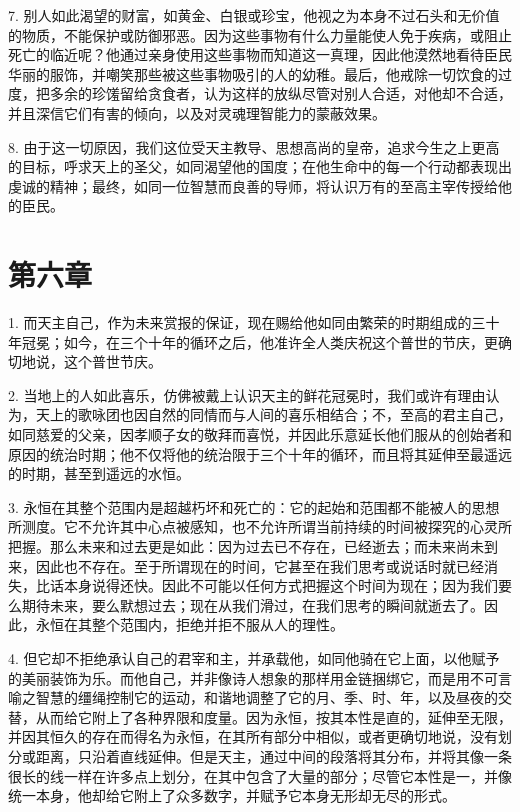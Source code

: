 7. 别人如此渴望的财富，如黄金、白银或珍宝，他视之为本身不过石头和无价值的物质，不能保护或防御邪恶。因为这些事物有什么力量能使人免于疾病，或阻止死亡的临近呢？他通过亲身使用这些事物而知道这一真理，因此他漠然地看待臣民华丽的服饰，并嘲笑那些被这些事物吸引的人的幼稚。最后，他戒除一切饮食的过度，把多余的珍馐留给贪食者，认为这样的放纵尽管对别人合适，对他却不合适，并且深信它们有害的倾向，以及对灵魂理智能力的蒙蔽效果。\par

8. 由于这一切原因，我们这位受天主教导、思想高尚的皇帝，追求今生之上更高的目标，呼求天上的圣父，如同渴望他的国度；在他生命中的每一个行动都表现出虔诚的精神；最终，如同一位智慧而良善的导师，将认识万有的至高主宰传授给他的臣民。\par


\section{第六章}

1. 而天主自己，作为未来赏报的保证，现在赐给他如同由繁荣的时期组成的三十年冠冕；如今，在三个十年的循环之后，他准许全人类庆祝这个普世的节庆，更确切地说，这个普世节庆。\par

2. 当地上的人如此喜乐，仿佛被戴上认识天主的鲜花冠冕时，我们或许有理由认为，天上的歌咏团也因自然的同情而与人间的喜乐相结合；不，至高的君主自己，如同慈爱的父亲，因孝顺子女的敬拜而喜悦，并因此乐意延长他们服从的创始者和原因的统治时期；他不仅将他的统治限于三个十年的循环，而且将其延伸至最遥远的时期，甚至到遥远的水恒。\par

3. 永恒在其整个范围内是超越朽坏和死亡的：它的起始和范围都不能被人的思想所测度。它不允许其中心点被感知，也不允许所谓当前持续的时间被探究的心灵所把握。那么未来和过去更是如此：因为过去已不存在，已经逝去；而未来尚未到来，因此也不存在。至于所谓现在的时间，它甚至在我们思考或说话时就已经消失，比话本身说得还快。因此不可能以任何方式把握这个时间为现在；因为我们要么期待未来，要么默想过去；现在从我们滑过，在我们思考的瞬间就逝去了。因此，永恒在其整个范围内，拒绝并拒不服从人的理性。\par

4. 但它却不拒绝承认自己的君宰和主，并承载他，如同他骑在它上面，以他赋予的美丽装饰为乐。而他自己，并非像诗人想象的那样用金链捆绑它，而是用不可言喻之智慧的缰绳控制它的运动，和谐地调整了它的月、季、时、年，以及昼夜的交替，从而给它附上了各种界限和度量。因为永恒，按其本性是直的，延伸至无限，并因其恒久的存在而得名为永恒，在其所有部分中相似，或者更确切地说，没有划分或距离，只沿着直线延伸。但是天主，通过中间的段落将其分布，并将其像一条很长的线一样在许多点上划分，在其中包含了大量的部分；尽管它本性是一，并像统一本身，他却给它附上了众多数字，并赋予它本身无形却无尽的形式。\par

